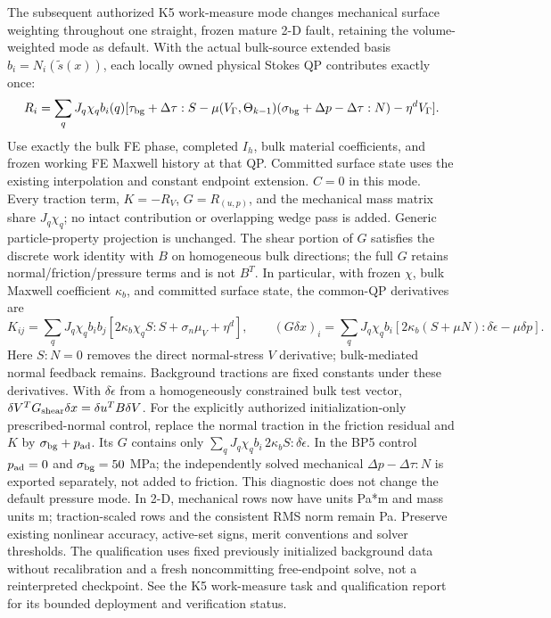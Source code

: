\documentclass[11pt]{article}
\begin{document}
The subsequent authorized K5 work-measure mode changes mechanical surface
weighting throughout one straight, frozen mature 2-D fault, retaining the
volume-weighted mode as default. With the actual bulk-source extended basis
$b_i=N_i(\widetilde s(x))$, each locally owned physical Stokes QP contributes
exactly once:
\[
 R_i=\sum_q J_q\chi_q b_i(q)
 [\tau_{\rm bg}+\Delta\tau:S-\mu(V_\Gamma,\Theta_{k-1})
 (\sigma_{\rm bg}+\Delta p-\Delta\tau:N)-\eta^d V_\Gamma].
\]
Use exactly the bulk FE phase, completed $I_h$, bulk material coefficients,
and frozen working FE Maxwell history at that QP. Committed surface state
uses the existing interpolation and constant endpoint extension. $C=0$ in
this mode. Every traction term, $K=-R_V$, $G=R_{(u,p)}$, and the mechanical
mass matrix share $J_q\chi_q$; no intact contribution or overlapping wedge
pass is added. Generic particle-property projection is unchanged.
The shear portion of $G$ satisfies the discrete work identity with $B$ on
homogeneous bulk directions; the full $G$ retains normal/friction/pressure
terms and is not $B^T$.
In particular, with frozen $\chi$, bulk Maxwell coefficient $\kappa_b$, and
committed surface state, the common-QP derivatives are
\[
 K_{ij}=\sum_q J_q\chi_q b_i b_j
 [2\kappa_b\chi_q S:S+\sigma_n\mu_V+\eta^d],\qquad
 (G\delta x)_i=\sum_q J_q\chi_q b_i
 [2\kappa_b(S+\mu N):\delta\dot\epsilon-\mu\delta p].
\]
Here $S:N=0$ removes the direct normal-stress $V$ derivative; bulk-mediated
normal feedback remains. Background tractions are fixed constants under
these derivatives. With $\delta\dot\epsilon$ from a homogeneously constrained
bulk test vector, $\delta V^T G_{\rm shear}\delta x=\delta u^T B\delta V$.
For the explicitly authorized initialization-only prescribed-normal control,
replace the normal traction in the friction residual and $K$ by
$\sigma_{\rm bg}+p_{\rm ad}$. Its $G$ contains only
$\sum_q J_q\chi_q b_i\,2\kappa_b S:\delta\dot\epsilon$.
In the BP5 control $p_{\rm ad}=0$ and $\sigma_{\rm bg}=50$ MPa; the independently
solved mechanical $\Delta p-\Delta\tau:N$ is exported separately, not added
to friction. This diagnostic does not change the default pressure mode.
In 2-D, mechanical rows now have units Pa*m and mass units m; traction-scaled
rows and the consistent RMS norm remain Pa. Preserve existing nonlinear
accuracy, active-set signs, merit conventions and solver thresholds.
The qualification uses fixed previously initialized background data without
recalibration and a fresh noncommitting free-endpoint solve, not a reinterpreted
checkpoint. See the K5 work-measure task and qualification report for its
bounded deployment and verification status.
\end{document}
